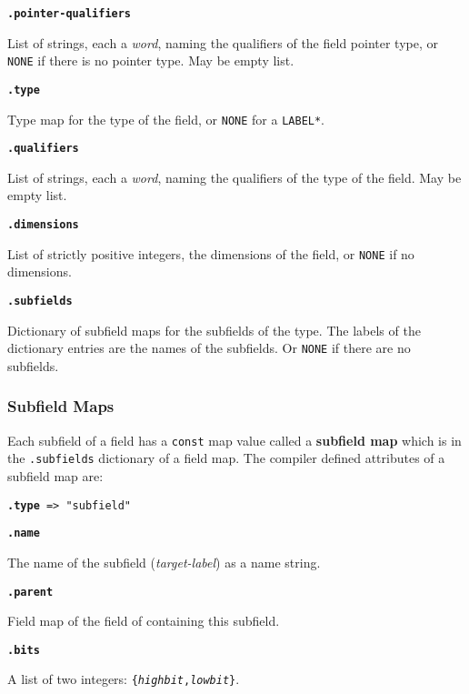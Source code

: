 \documentclass[12pt]{article}
\newcommand{\key}[1]{{\rm \bfseries #1}}
\newcommand{\ttkey}[1]{{\tt \bfseries #1}}
\newenvironment{indpar}[1][0.3in]%
	{\begin{list}{}%
		     {\setlength{\itemsep}{0in}%
		      \setlength{\topsep}{0in}%
		      \setlength{\parsep}{1ex}%
		      \setlength{\labelwidth}{#1}%
		      \setlength{\leftmargin}{#1}%
		      \addtolength{\leftmargin}{\labelsep}}%
	 \item}%
	{\end{list}}
\begin{document}
\ttkey{.pointer-qualifiers}
\begin{indpar}
List of strings, each a {\em word}, naming the qualifiers
of the field pointer type, or {\tt NONE} if there is no
pointer type.  May be empty list.
\end{indpar}

\ttkey{.type}
\begin{indpar}
Type map for the type of the field, or {\tt NONE}
for a {\tt *LABEL*}.
\end{indpar}

\ttkey{.qualifiers}
\begin{indpar}
List of strings, each a {\em word}, naming the qualifiers
of the type of the field.  May be empty list.
\end{indpar}

\ttkey{.dimensions}
\begin{indpar}
List of strictly positive integers, the dimensions of the field, or {\tt NONE}
if no dimensions.
\end{indpar}

\ttkey{.subfields}
\begin{indpar}
Dictionary of subfield maps for the subfields of the type.  The labels
of the dictionary entries are the names of the subfields.
Or {\tt NONE} if there are no subfields.
\end{indpar}

\subsubsection{Subfield Maps}
\label{SUBFIELD-MAPS}

Each subfield of a field has a {\tt const} map value called
a \key{subfield map} which is in the {\tt .subfields} dictionary of
a field map.  The compiler defined attributes of a subfield map are:

{\tt \ttkey{.type} => "subfield"}

\ttkey{.name}
\begin{indpar}
The name of the subfield ({\em target-label})
as a name string.
\end{indpar}

\ttkey{.parent}
\begin{indpar}
Field map of the field of containing this subfield.
\end{indpar}

\ttkey{.bits}
\begin{indpar}
A list of two integers: {\tt \{{\rm \em highbit},{\rm \em lowbit}\}}.
\end{indpar}
\end{document}
